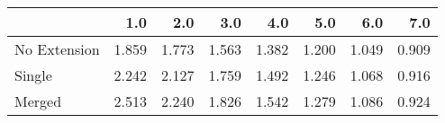 \begin{tabular}{lrrrrrrr}
\toprule
{} &   1.0 &   2.0 &   3.0 &   4.0 &   5.0 &   6.0 &   7.0 \\
\midrule
No Extension & 1.859 & 1.773 & 1.563 & 1.382 & 1.200 & 1.049 & 0.909 \\
Single       & 2.242 & 2.127 & 1.759 & 1.492 & 1.246 & 1.068 & 0.916 \\
Merged       & 2.513 & 2.240 & 1.826 & 1.542 & 1.279 & 1.086 & 0.924 \\
\bottomrule
\end{tabular}
